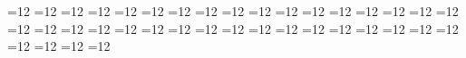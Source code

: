 =12 %
{}=12 %
{}=12 %
{}=12 %
{}=12 %
{}=12 %
{}=12 %
{}=12 %
{}=12 %
{}=12 %
{}=12 %
{}=12 %
{}=12 %
{}=12 %
{}=12 %
{}=12 %
{}=12 %
{}=12 %
{}=12 %
{}=12 %
{}=12 %
{}=12 %
{}=12 %
{}=12 %
{}=12 %
{}=12 %
{}=12 %
{}=12 %
{}=12 %
{}=12 %
{}=12 %
{}=12 %
{}=12 %
=12 %
{}=12 %
{}=12 %
{}=12 %
{}=12 %
